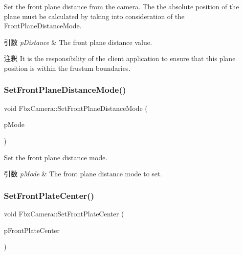 Set the front plane distance from the camera. The the absolute position of the plane must be calculated by taking into consideration of the Front\+Plane\+Distance\+Mode. 
\begin{DoxyParams}{引数}
{\em p\+Distance} & The front plane distance value. \\
\hline
\end{DoxyParams}
\begin{DoxyRemark}{注釈}
It is the responsibility of the client application to ensure that this plane position is within the frustum boundaries. 
\end{DoxyRemark}
\mbox{\label{class_fbx_camera_ab0ea0c88ba780d06d5b6ac9c6f128c23}} 
\subsubsection{\texorpdfstring{Set\+Front\+Plane\+Distance\+Mode()}{SetFrontPlaneDistanceMode()}}
{\footnotesize\ttfamily void Fbx\+Camera\+::\+Set\+Front\+Plane\+Distance\+Mode (\begin{DoxyParamCaption}\item[{\hyperlink{class_fbx_camera_a79e74898d117e741c3fbd10b1ef21c79}{E\+Front\+Back\+Plane\+Distance\+Mode}}]{p\+Mode }\end{DoxyParamCaption})}

Set the front plane distance mode. 
\begin{DoxyParams}{引数}
{\em p\+Mode} & The front plane distance mode to set. \\
\hline
\end{DoxyParams}
\mbox{\label{class_fbx_camera_a7401f702c8c08483a70c5080ff04f59a}} 
\subsubsection{\texorpdfstring{Set\+Front\+Plate\+Center()}{SetFrontPlateCenter()}}
{\footnotesize\ttfamily void Fbx\+Camera\+::\+Set\+Front\+Plate\+Center (\begin{DoxyParamCaption}\item[{bool}]{p\+Front\+Plate\+Center }\end{DoxyParamCaption})}

